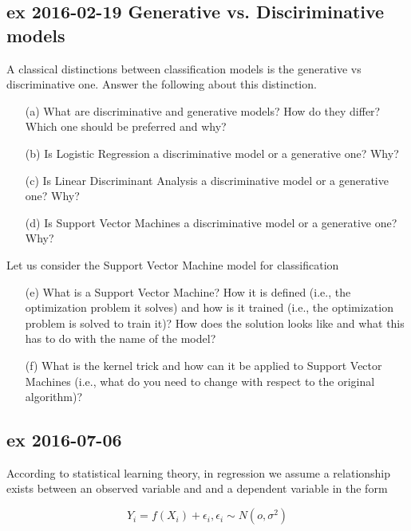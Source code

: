 \documentclass[a4paper,12pt,titlepage]{article} %
\begin{document}
\subsection{ex 2016-02-19 Generative vs. Disciriminative models}
A classical distinctions between classification models is the generative vs discriminative one. Answer the following about this distinction.

\begin{itemize}
\item[(a)] What are discriminative and generative models? How do they differ? Which one should be preferred and why?
\item[(b)] Is Logistic Regression a discriminative model or a generative one? Why?
\item[(c)] Is Linear Discriminant Analysis a discriminative model or a generative one? Why?
\item[(d)] Is Support Vector Machines a discriminative model or a generative one? Why?
\end{itemize}

Let us consider the Support Vector Machine model for classification

\begin{itemize}
\item[(e)] What is a Support Vector Machine? How it is defined (i.e., the optimization problem it solves) and how is it trained (i.e., the optimization problem is solved to train it)? How does the solution looks like and what this has to do with the name of the model?
\item[(f)] What is the kernel trick and how can it be applied to Support Vector Machines (i.e., what do you need to change with respect to the original algorithm)?
\end{itemize}

\subsection{ex 2016-07-06}
According to statistical learning theory, in regression we assume a relationship exists between an observed variable and and a dependent variable in the form 

$$ Y_{i} = f(X_{i}) + \epsilon_{i}, \epsilon_{i} \sim N(o, \sigma^{2})$$
\end{document}
